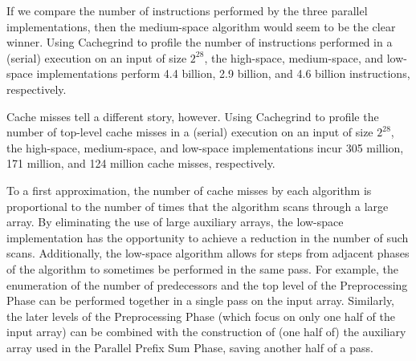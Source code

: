 \documentclass[sigconf]{acmart}
\renewcommand{\paragraph}[1]{\vspace{0.09in}\noindent{\bf \boldmath #1.}}
\theoremstyle{remark}
\theoremstyle{remark}
\begin{document}
\paragraph{The Source of the Speedup}
If we compare the number of instructions performed by the three
parallel implementations, then the medium-space algorithm would seem
to be the clear winner. Using Cachegrind to profile the number of
instructions performed in a (serial) execution on an input of size
$2^{28}$, the high-space, medium-space, and low-space implementations
perform 4.4 billion, 2.9 billion, and 4.6 billion instructions,
respectively.

Cache misses tell a different story, however. Using Cachegrind to
profile the number of top-level cache misses in a (serial) execution
on an input of size $2^{28}$, the high-space, medium-space, and
low-space implementations incur 305 million, 171 million, and 124
million cache misses, respectively.

To a first approximation, the number of cache misses by each algorithm
is proportional to the number of times that the algorithm scans
through a large array. By eliminating the use of large auxiliary
arrays, the low-space implementation has the opportunity to achieve a
reduction in the number of such scans. Additionally, the low-space
algorithm allows for steps from adjacent phases of the algorithm to
sometimes be performed in the same pass. For example, the enumeration
of the number of predecessors and the top level of the Preprocessing
Phase can be performed together in a single pass on the input
array. Similarly, the later levels of the Preprocessing Phase (which
focus on only one half of the input array) can be combined with the
construction of (one half of) the auxiliary array used in the Parallel
Prefix Sum Phase, saving another half of a pass.


\end{document}

